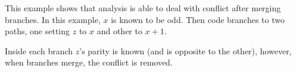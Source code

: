 This example shows that analysis is able to deal with conflict after
merging branches. In this example, $x$ is known to be odd. Then code
branches to two paths, one setting $z$ to $x$ and other to $x+1$.

Inside each branch $z$'s parity is known (and is opposite to the other),
however, when branches merge, the conflict is removed.

